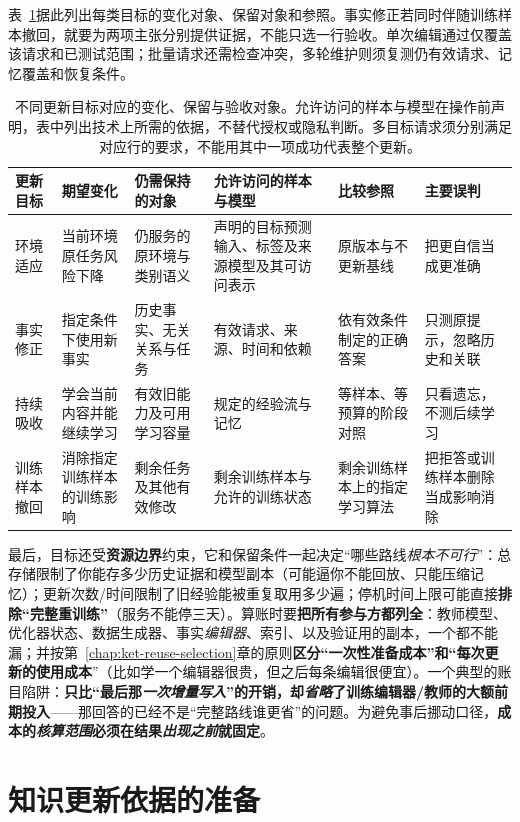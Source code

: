 表~\ref{tab:ket-update-goals}据此列出每类目标的变化对象、保留对象和参照。事实修正若同时伴随训练样本撤回，就要为两项主张分别提供证据，不能只选一行验收。单次编辑通过仅覆盖该请求和已测试范围；批量请求还需检查冲突，多轮维护则须复测仍有效请求、记忆覆盖和恢复条件。

\begin{table}[htbp]
\small
\begin{tabularx}{\linewidth}{@{}p{16mm}XXXXX@{}}
\toprule
更新目标 & 期望变化 & 仍需保持的对象 & 允许访问的样本与模型 & 比较参照 & 主要误判 \\
\midrule
环境适应 & 当前环境原任务风险下降 & 仍服务的原环境与类别语义 & 声明的目标预测输入、标签及来源模型及其可访问表示 & 原版本与不更新基线 & 把更自信当成更准确 \\
事实修正 & 指定条件下使用新事实 & 历史事实、无关关系与任务 & 有效请求、来源、时间和依赖 & 依有效条件制定的正确答案 & 只测原提示，忽略历史和关联 \\
持续吸收 & 学会当前内容并能继续学习 & 有效旧能力及可用学习容量 & 规定的经验流与记忆 & 等样本、等预算的阶段对照 & 只看遗忘，不测后续学习 \\
训练样本撤回 & 消除指定训练样本的训练影响 & 剩余任务及其他有效修改 & 剩余训练样本与允许的训练状态 & 剩余训练样本上的指定学习算法 & 把拒答或训练样本删除当成影响消除 \\
\bottomrule
\end{tabularx}
\caption{不同更新目标对应的变化、保留与验收对象。允许访问的样本与模型在操作前声明，表中列出技术上所需的依据，不替代授权或隐私判断。多目标请求须分别满足对应行的要求，不能用其中一项成功代表整个更新。}
\label{tab:ket-update-goals}
\end{table}

最后，目标还受\textbf{资源边界}约束，它和保留条件一起决定“哪些路线\emph{根本不可行}”：总存储限制了你能存多少历史证据和模型副本（可能逼你不能回放、只能压缩记忆）；更新次数/时间限制了旧经验能被重复取用多少遍；停机时间上限可能直接\textbf{排除“完整重训练”}（服务不能停三天）。算账时要\textbf{把所有参与方都列全}：教师模型、优化器状态、数据生成器、事实\emph{编辑器}、索引、以及验证用的副本，一个都不能漏；并按第~\ref{chap:ket-reuse-selection}章的原则\textbf{区分“一次性准备成本”和“每次更新的使用成本}”（比如学一个编辑器很贵，但之后每条编辑很便宜）。一个典型的账目陷阱：\textbf{只比“最后那\emph{一次增量写入}”的开销，却\emph{省略}了训练编辑器/教师的大额前期投入}——那回答的已经不是“完整路线谁更省”的问题。为避免事后挪动口径，\textbf{成本的\emph{核算范围}必须在结果\emph{出现之前}就固定}。

\section{知识更新依据的准备}
\label{sec:ket-update-evidence}

